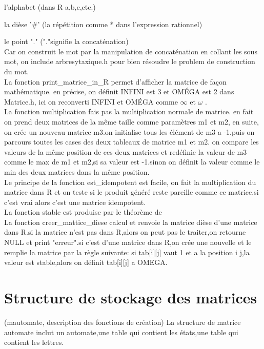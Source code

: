 \documentclass{report}
\begin{document}
	l'alphabet  (dans R a,b,c,etc.)

    la dièse '$\#$'  (la répétition comme * dans l'expression rationnel)

    le point "."  ("."signifie la concaténation)\\
Car on construit le mot par la manipulation de concaténation en collant les sous mot, on include arbresytaxique.h pour bien résoudre le problem de construction du mot.\\

La fonction print\_matrice\_in\_R permet d'afficher la matrice de façon mathématique. en précise, on définit INFINI est 3 et OMÉGA est 2 dans Matrice.h, ici on reconverti INFINI et OMÉGA comme $\infty$ et $\omega$ .\\

La fonction multiplication fais pas la multiplication normale de matrice. en fait on prend deux matrices de la même taille comme paramètres m1 et m2, en suite, on crée un nouveau matrice m3.on initialise tous les élément de m3 a -1.puis on  parcours toutes les cases des deux tableaux de matrice m1 et m2. on compare les valeurs de la même position de ces deux matrices et redéfinie la valeur de m3 comme le max de m1 et m2,si sa valeur est  -1.sinon on définit la valeur comme  le min des deux matrices dans la même position. \\

Le principe de la fonction est_idempotent est facile, on fait la multiplication du matrice dans R et on teste si le produit généré reste pareille comme ce matrice.si c'est vrai alors c'est une matrice idempotent.\\

La fonction stable est produise par le théorème de \\


La fonction creer\_mattice\_diese calcul et renvoie la matrice dièse d'une matrice dans R.si la matrice n'est pas dans R,alors on peut pas le traiter,on retourne NULL et print "erreur".si c'est d'une matrice dans R,on crée une nouvelle  et le remplie la matrice par la règle suivante:
si tab[i][j] vaut 1 et a la position i j,la valeur est stable,alors on définit tab[i][j] a OMEGA.\\

\chapter{Structure de stockage des matrices}

(mautomate, description des fonctions de création)
La structure de matrice automate inclut un automate,une table qui contient les états,une table qui contient les lettres.\\
\end{document}
